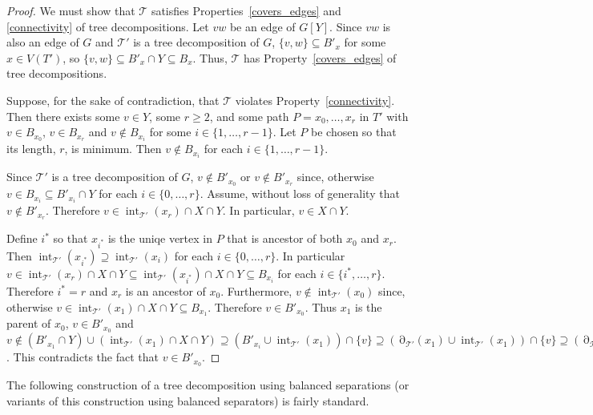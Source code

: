 \documentclass{patmorin}
\DeclareMathOperator{\interior}{int}
\DeclareMathOperator{\boundary}{\partial}
\begin{document}
\begin{proof}
  We must show that $\mathcal{T}$ satisfies Properties~\ref{covers_edges} and \ref{connectivity} of tree decompositions.
  Let $vw$ be an edge of $G[Y]$.  Since $vw$ is also an edge of $G$ and  $\mathcal{T'}$ is a tree decomposition of $G$,  $\{v,w\}\subseteq B'_x$ for some $x\in V(T')$, so $\{v,w\}\subseteq B'_x\cap Y\subseteq  B_x$. Thus, $\mathcal{T}$ has Property~\ref{covers_edges} of tree decompositions.

  Suppose, for the sake of contradiction, that $\mathcal{T}$ violates Property~\ref{connectivity}.  Then there exists some $v\in Y$, some $r\ge 2$, and some path $P=x_0,\ldots,x_r$ in $T'$ with $v\in B_{x_0}$, $v\in B_{x_r}$ and $v\not\in B_{x_i}$ for some $i\in\{1,\ldots,r-1\}$.  Let $P$ be chosen so that its length, $r$, is minimum.  Then $v\not\in B_{x_i}$ for each $i\in\{1,\ldots,r-1\}$.

  Since $\mathcal{T}'$ is a tree decomposition of $G$, $v\not\in B'_{x_0}$ or $v\not\in B'_{x_r}$ since, otherwise $v\in B_{x_i}\subseteq B'_{x_i}\cap Y$ for each $i\in\{0,\ldots,r\}$.  Assume, without loss of generality that $v\not\in B'_{x_r}$. Therefore $v\in\interior_{\mathcal{T}'}(x_r)\cap X\cap Y$.  In particular, $v\in X\cap Y$.

  Define $i^*$ so that $x_{i^*}$ is the uniqe vertex in $P$ that is ancestor of both $x_0$ and $x_r$.  Then  $\interior_{\mathcal{T}'}(x_{i^*})\supseteq \interior_{\mathcal{T}'}(x_i)$ for each $i\in\{0,\ldots,r\}$.  In particular $v\in \interior_{\mathcal{T}'}(x_r)\cap X\cap Y\subseteq\interior_{\mathcal{T}'}(x_{i^*})\cap X\cap Y\subseteq B_{x_{i}}$ for each $i\in\{i^*,\ldots,r\}$.  Therefore $i^*=r$ and $x_r$ is an ancestor of $x_0$. Furthermore, $v\not\in\interior_{\mathcal{T}'}(x_0)$ since, otherwise $v\in\interior_{\mathcal{T}'}(x_1)\cap X\cap Y\subseteq B_{x_1}$. Therefore $v\in B'_{x_0}$.  Thus $x_1$ is the parent of $x_0$, $v\in B'_{x_0}$ and $v\not\in (B'_{x_1}\cap Y)\cup (\interior_{\mathcal{T}'}(x_1)\cap X\cap Y)
  \supseteq (B'_{x_i}\cup \interior_{\mathcal{T}'}(x_1))\cap\{v\}
  \supseteq (\boundary_{\mathcal{T}'}(x_1)\cup \interior_{\mathcal{T}'}(x_1))\cap\{v\} \supseteq (\boundary_{\mathcal{T}'}(x_0)\cup \interior_{\mathcal{T}'}(x_0))\cap \{v\} \supseteq B'_{x_0}\cap\{v\}$. This contradicts the fact that $v\in B'_{x_0}$.
\end{proof}


The following construction of a tree decomposition using balanced separations (or variants of this construction using balanced separators) is fairly standard.
\end{document}
